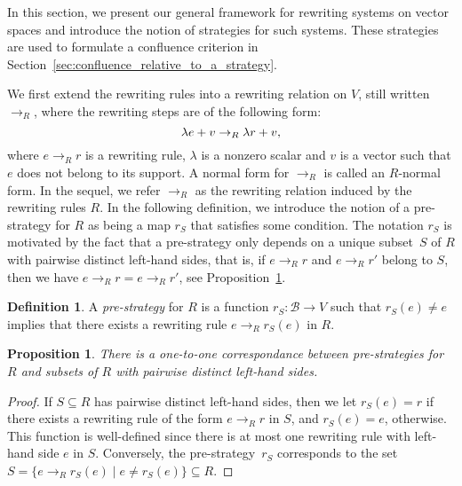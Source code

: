 \documentclass[10pt]{easychair}
\newtheorem{proposition}[theorem]{Proposition}
\theoremstyle{definition}
\newtheorem{definition}[theorem]{Definition}
\newcommand\basis{\mathscr{B}}
\newcommand\rewR{\to_R}
\begin{document}
In this section, we present our general framework for rewriting systems
on vector spaces and introduce the notion of strategies for such systems.
These strategies are used to formulate a confluence criterion in 
Section~\ref{sec:confluence_relative_to_a_strategy}.
\medskip

We first extend the rewriting rules into a rewriting relation on $V$,
still written $\rewR$, where the rewriting steps are of the following
form: 
\begin{equation}\label{equ:R_rewriting_step}
  \lambda e+v\rewR\lambda r+v,
  \smallskip
\end{equation}
where $e\rewR r$ is a rewriting rule, $\lambda$ is a nonzero scalar and
$v$ is a vector such that $e$ does not belong to its support. A normal
form for $\rewR$ is called an $R$-normal form. In the sequel, we refer
$\rewR$ as the rewriting relation induced by the rewriting rules $R$. In
the following definition, we introduce the notion of a pre-strategy for
$R$ as being a map $r_S$ that satisfies some condition. The notation
$r_S$ is motivated by the fact that a pre-strategy only depends on a
unique subset~$S$ of $R$ with pairwise distinct left-hand sides, that is,
if $e\rewR r$ and $e\rewR r'$ belong to $S$, then we have
$e\rewR r=e\rewR r'$, see
Proposition~\ref{prop:pre-stratagies_caracterisation}.
\smallskip

\begin{definition}
  A {\em pre-strategy} for $R$ is a function $r_S:\basis\to V$ such that
  $r_S(e)\neq e$ implies that there exists a rewriting rule
  $e\rewR r_S(e)$ in $R$.
\end{definition}
\smallskip

\begin{proposition}\label{prop:pre-stratagies_caracterisation}
  There is a one-to-one correspondance between pre-strategies for $R$ and
  subsets of $R$ with pairwise distinct left-hand sides.
\end{proposition}

\begin{proof}
  If $S\subseteq R$ has pairwise distinct left-hand sides, then we let
  $r_S(e)=r$ if there exists a rewriting rule of the form $e\rewR r$ in
  $S$, and $r_S(e)=e$, otherwise. This function is well-defined since
  there is at most one rewriting rule with left-hand side $e$ in $S$.
  Conversely, the pre-strategy~$r_S$ corresponds to the set
  $S=\{e\rewR r_S(e)\mid e\neq r_S(e)\}\subseteq R$.
\end{proof}
\smallskip
\end{document}
